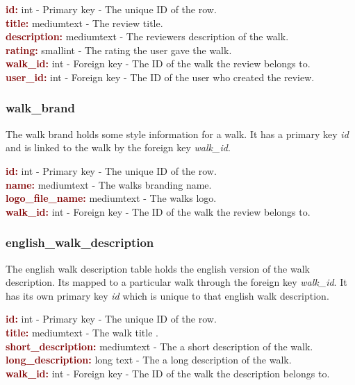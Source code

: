 \documentclass[11pt,a4paper]{report}
\begin{document}
\textbf{\textcolor{Maroon}{id:}} int - Primary key - The unique ID of the row. \\
\textbf{\textcolor{Maroon}{title:}} mediumtext -  The review title.\\
\textbf{\textcolor{Maroon}{description:}} mediumtext - The reviewers description of the walk.\\
\textbf{\textcolor{Maroon}{rating:}} smallint - The rating the user gave the walk. \\
\textbf{\textcolor{Maroon}{walk\_id:}} int - Foreign key - The ID of the walk the review belongs to.\\
\textbf{\textcolor{Maroon}{user\_id:}} int - Foreign key - The ID of the user who created the review.

\subsubsection{walk\_brand}
The walk brand holds some style information for a walk. It has a primary key \textit{id} and is linked to the walk by the foreign key \textit{walk\_id}. 

\textbf{\textcolor{Maroon}{id:}} int - Primary key - The unique ID of the row. \\
\textbf{\textcolor{Maroon}{name:}} mediumtext -  The walks branding name.\\
\textbf{\textcolor{Maroon}{logo\_file\_name:}} mediumtext - The walks logo.\\
\textbf{\textcolor{Maroon}{walk\_id:}} int - Foreign key - The ID of the walk the review belongs to.\\

\subsubsection{english\_walk\_description}
The english walk description table holds the english version of the walk description. Its mapped to a particular walk through the foreign key \textit{walk\_id}. It has its own primary key \textit{id} which is unique to that english walk description. 

\textbf{\textcolor{Maroon}{id:}} int - Primary key - The unique ID of the row. \\
\textbf{\textcolor{Maroon}{title:}} mediumtext -  The walk title .\\
\textbf{\textcolor{Maroon}{short\_description:}} mediumtext - The a short description of the walk.\\
\textbf{\textcolor{Maroon}{long\_description:}} long text - The a long description of the walk. \\
\textbf{\textcolor{Maroon}{walk\_id:}} int - Foreign key - The ID of the walk the description belongs to.
\end{document}
